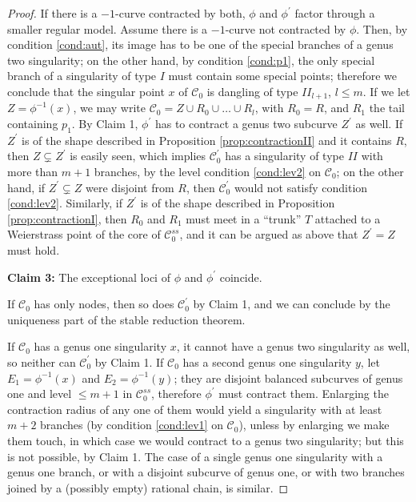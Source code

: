 \documentclass[11pt]{amsart}
\theoremstyle{plain}
\theoremstyle{definition}
\begin{document}
\begin{proof}
 \noindent If there is a $-1$-curve contracted by both, $\phi$ and $\phi^\prime$ factor through a smaller regular model. Assume there is a $-1$-curve not contracted by $\phi$. Then, by condition \eqref{cond:aut}, its image has to be one of the special branches of a genus two singularity; on the other hand, by condition \eqref{cond:p1}, the only special branch of a singularity of type $I$ must contain some special points; therefore we conclude that the singular point $x$ of $\mathcal C_0$ is dangling of type $I\!I_{l+1}$, $l\leq m$. If we let $Z=\phi^{-1}(x)$, we may write $\mathcal C_0=Z\cup R_0\cup\ldots\cup R_l$, with $R_0=R$, and $R_1$ the tail containing $p_1$. 
 By Claim 1, $\phi^\prime$ has to contract a genus two subcurve $Z^\prime$ as well. If $Z^\prime$ is of the shape described in Proposition \ref{prop:contractionII} and it contains $R$, then $Z\subsetneq Z^\prime$ is easily seen, which implies $\mathcal C^\prime_0$ has a singularity of type $I\!I$ with more than $m+1$ branches, by the level condition \eqref{cond:lev2} on $\mathcal C_0$; on the other hand, if $Z^\prime\subsetneq Z$ were disjoint from $R$, then $\mathcal C^\prime_0$ would not satisfy condition \eqref{cond:lev2}. Similarly, if $Z^\prime$ is of the shape described in Proposition \ref{prop:contractionI}, then $R_0$ and $R_1$ must meet in a ``trunk'' $T$ attached to a Weierstrass point of the core of $\mathcal C_0^{ss}$, and it can be argued as above that $Z^\prime=Z$ must hold.
 
 \textbf{Claim 3:} The exceptional loci of $\phi$ and $\phi^\prime$ coincide.
 
 \noindent If $\mathcal C_0$ has only nodes, then so does $\mathcal C^\prime_0$ by Claim 1, and we can conclude by the uniqueness part of the stable reduction theorem.
 
 If $\mathcal C_0$ has a genus one singularity $x$, it cannot have a genus two singularity as well, so neither can $\mathcal C^\prime_0$ by Claim 1. If $\mathcal C_0$ has a second genus one singularity $y$, let $E_1=\phi^{-1}(x)$ and $E_2=\phi^{-1}(y)$; they are disjoint balanced subcurves of genus one and level $\leq m+1$ in $\mathcal C^{ss}_0$, therefore $\phi^\prime$ must contract them. Enlarging the contraction radius of any one of them would yield a singularity with at least $m+2$ branches (by condition \eqref{cond:lev1} on $\mathcal C_0$), unless by enlarging we make them touch, in which case we would contract to a genus two singularity; but this is not possible, by Claim 1. The case of a single genus one singularity with a genus one branch, or with a disjoint subcurve of genus one, or with two branches joined by a (possibly empty) rational chain, is similar.
 

\end{proof}
\end{document}
